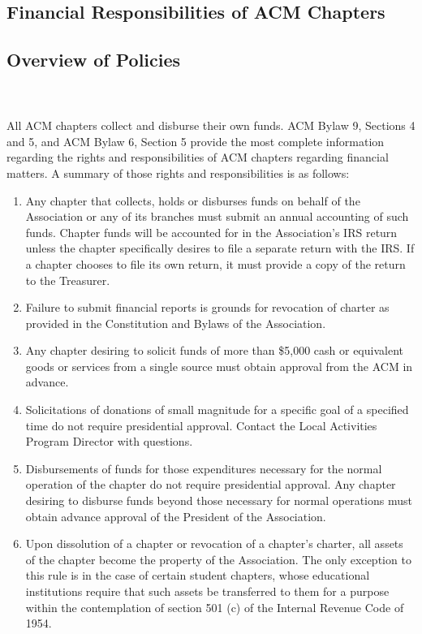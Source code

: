 \subsection{Financial Responsibilities of ACM Chapters}
\subsection*{Overview of Policies}
\\
\\
All ACM chapters collect and disburse their own funds. ACM Bylaw 9, Sections 4
and 5, and ACM Bylaw 6, Section 5 provide the most complete information
regarding the rights and responsibilities of ACM chapters regarding
financial matters. A summary of those rights and responsibilities is as follows:
\begin{enumerate}
	\item Any chapter that collects, holds or disburses funds on behalf of the
				Association or any of its branches must submit an annual accounting
				of such funds.
				Chapter funds will be accounted for in the Association's IRS return
				unless the chapter specifically desires to file a separate return with
				the IRS. If a chapter chooses to file its own return, it must provide
				a copy of the return to the Treasurer.
	\item Failure to submit financial reports is grounds for revocation of
				charter as provided in the Constitution and Bylaws of the Association.
  \item Any chapter desiring to solicit funds of more than \$5,000 cash or
				equivalent goods or services from a single source must obtain approval
				from the ACM in advance.
  \item Solicitations of donations of small magnitude for a specific goal of
				a specified time do not require presidential approval. Contact the Local
				Activities Program Director with questions.
  \item Disbursements of funds for those expenditures necessary for the normal
				operation of the chapter do not require presidential approval. Any
				chapter desiring to disburse funds beyond those necessary for normal
				operations must obtain advance approval of the President of the
				Association.
  \item Upon dissolution of a chapter or revocation of a chapter's charter,
				all assets of the chapter become the property of the Association. The
				only exception to this rule is in the case of certain student chapters,
				whose educational institutions require that such assets be transferred
				to them for a purpose within the contemplation of section 501 (c) of the
				Internal Revenue Code of 1954.
\end{enumerate}

